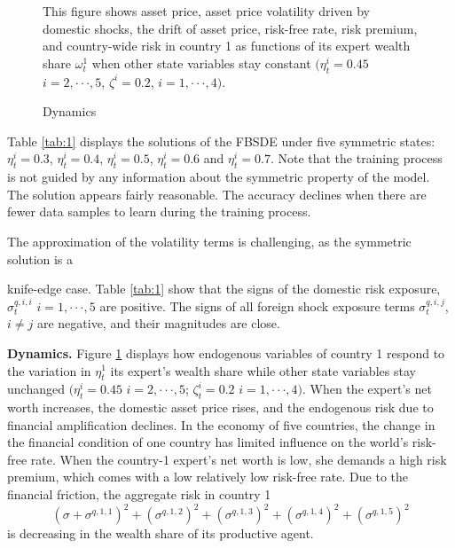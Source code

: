 \documentclass{article}
\begin{document}
\begin{figure}[h]
    \centering
    \caption{Dynamics}
    \label{fig:3}
    \small
    This figure shows asset price, asset price volatility driven by domestic shocks, the drift of asset price, risk-free rate, risk premium, and country-wide risk in country 1 as functions of its expert wealth share $\omega_{t}^{1}$ when other state variables stay constant $(\eta_{t}^{i}=0.45$ $i=2,\cdot\cdot\cdot,5$, $\zeta^{i}=0.2$, $i=1,\cdot\cdot\cdot,4)$.
\end{figure}

Table \ref{tab:1} displays the solutions of the FBSDE under five symmetric states: $\eta_{t}^{i}=0.3$, $\eta_{t}^{i}=0.4$, $\eta_{t}^{i}=0.5$, $\eta_{t}^{i}=0.6$ and $\eta_{t}^{i}=0.7$. Note that the training process is not guided by any information about the symmetric property of the model. The solution appears fairly reasonable. The accuracy declines when there are fewer data samples to learn during the training process.

The approximation of the volatility terms is challenging, as the symmetric solution is a

\clearpage

knife-edge case. Table \ref{tab:1} show that the signs of the domestic risk exposure, $\sigma_{t}^{q,i,i}$ $i=1,\cdot\cdot\cdot,5$ are positive. The signs of all foreign shock exposure terms $\sigma_{t}^{q,i,j}$, $i\ne j$ are negative, and their magnitudes are close.

\textbf{Dynamics.} Figure \ref{fig:3} displays how endogenous variables of country 1 respond to the variation in $\eta_{t}^{1}$ its expert's wealth share while other state variables stay unchanged $(\eta_{t}^{i}=0.45$ $i=2,\cdot\cdot\cdot,5$; $\zeta_{t}^{i}=0.2$ $i=1,\cdot\cdot\cdot,4)$. When the expert's net worth increases, the domestic asset price rises, and the endogenous risk due to financial amplification declines. In the economy of five countries, the change in the financial condition of one country has limited influence on the world's risk-free rate. When the country-1 expert's net worth is low, she demands a high risk premium, which comes with a low relatively low risk-free rate. Due to the financial friction, the aggregate risk in country 1
\[
(\sigma+\sigma^{q,1,1})^{2}+(\sigma^{q,1,2})^{2}+(\sigma^{q,1,3})^{2}+(\sigma^{q,1,4})^{2}+(\sigma^{q,1,5})^{2}
\]
is decreasing in the wealth share of its productive agent.
\end{document}
